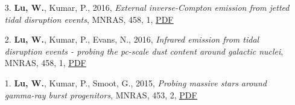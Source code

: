 \begin{itemize}[leftmargin=0.65cm]
\vspace{-0.1cm}
\item[3.]{{\bf Lu, W.}, Kumar, P., 2016, {\it External inverse-Compton emission from jetted tidal disruption events}, MNRAS, 458, 1, \href{https://ui.adsabs.harvard.edu/abs/2016MNRAS.458.1071L}{\underline{PDF}}}

\vspace{-0.1cm}
\item[2.]{{\bf Lu, W.}, Kumar, P., Evans, N., 2016, {\it Infrared emission from tidal disruption events - probing the pc-scale dust content around galactic nuclei}, MNRAS, 458, 1, \href{https://ui.adsabs.harvard.edu/abs/2016MNRAS.458..575L}{\underline{PDF}}}

\vspace{-0.1cm}
\item[1.]{{\bf Lu, W.}, Kumar, P., Smoot, G., 2015, {\it Probing massive stars around gamma-ray burst progenitors}, MNRAS, 453, 2, \href{https://ui.adsabs.harvard.edu/abs/2015MNRAS.453.1458L}{\underline{PDF}}}
\end{itemize}